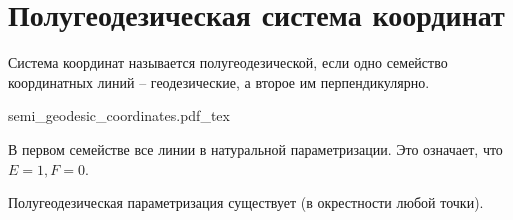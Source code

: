 \documentclass[main]{subfiles}
\begin{document}
\section{Полугеодезическая система координат}
\begin{definition}
    Система координат называется полугеодезической, если одно семейство координатных линий -- геодезические,
    а второе им перпендикулярно.
    \begin{center}
        {semi_geodesic_coordinates.pdf_tex}
    \end{center}
    В первом семействе все линии в натуральной параметризации.
    Это означает, что $E = 1, F = 0$.
\end{definition}
\begin{theorem}
    Полугеодезическая параметризация существует (в окрестности любой точки).
\end{theorem}
\end{document}
